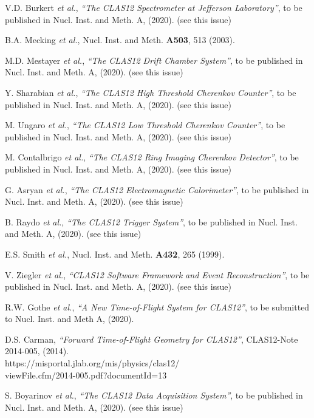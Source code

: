 \documentclass[3p,times,twocolumn]{elsarticle}
\begin{document}
\begin{thebibliography}{99}

V.D. Burkert {\it et al.}, {\it ``The CLAS12 Spectrometer at Jefferson Laboratory''}, to be published in
Nucl. Inst. and Meth. A, (2020). (see this issue)
  
B.A. Mecking {\it et al.}, Nucl. Inst. and Meth. {\bf A503}, 513 (2003).

M.D. Mestayer {\it et al.}, {\it ``The CLAS12 Drift Chamber System''}, to be published in Nucl. Inst.
and Meth. A, (2020). (see this issue)

Y. Sharabian {\it et al.}, {\it ``The CLAS12 High Threshold Cherenkov Counter''}, to be published in Nucl. Inst.
and Meth. A, (2020). (see this issue)
  
M. Ungaro {\it et al.}, {\it ``The CLAS12 Low Threshold Cherenkov Counter''}, to be published in Nucl. Inst.
and Meth. A, (2020). (see this issue)
  
M. Contalbrigo {\it et al.}, {\it ``The CLAS12 Ring Imaging Cherenkov Detector''}, to be published in Nucl. Inst.
and Meth. A, (2020). (see this issue)

G. Asryan {\it et al.}, {\it ``The CLAS12 Electromagnetic Calorimeter''}, to be published in Nucl. Inst.
and Meth. A, (2020). (see this issue)

B. Raydo {\it et al.}, {\it ``The CLAS12 Trigger System''}, to be published in Nucl. Inst. and Meth. A, (2020).
(see this issue)
  
E.S. Smith {\it et al.}, Nucl. Inst. and Meth. {\bf A432}, 265 (1999).

V. Ziegler {\it et al.}, {\it ``CLAS12 Software Framework and Event Reconstruction''}, to be published in Nucl. Inst.
and Meth. A, (2020). (see this issue)

R.W. Gothe {\it et al.}, {\it ``A New Time-of-Flight System for CLAS12''}, to be submitted to Nucl. Inst.
and Meth A, (2020).

D.S. Carman, {\it ``Forward Time-of-Flight Geometry for CLAS12''}, CLAS12-Note 2014-005, (2014). \\
https://misportal.jlab.org/mis/physics/clas12/\\ viewFile.cfm/2014-005.pdf?documentId=13

S. Boyarinov {\it et al.}, {\it ``The CLAS12 Data Acquisition System''}, to be published in Nucl. Inst. and
Meth. A, (2020). (see this issue)


\end{thebibliography}
\end{document}
